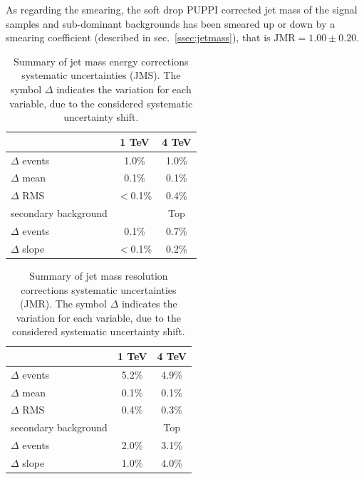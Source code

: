\noindent As regarding the smearing, the soft drop PUPPI corrected jet mass of the signal samples and sub-dominant backgrounds has been smeared up or down by a smearing coefficient (described in sec.~\ref{ssec:jetmass}), that is $ \text{JMR} = 1.00 \pm 0.20$.
\begin{table}[!htb]
  \centering
  \caption{Summary of jet mass energy corrections systematic uncertainties (JMS). The symbol $\Delta$ indicates the variation for each variable, due to the considered systematic uncertainty shift. \label{tab:jet_mass_energy_corr}}
  \begin{tabular}{l|cc}
	\mtVZ & 1 TeV & 4 TeV \\
        \hline
	\hline
	$\Delta$ events & 1.0\% & 1.0\% \\
	$\Delta$ mean & 0.1\%& 0.1\% \\
	$\Delta$ RMS & $<$0.1\% & 0.4\% \\
	\hline
	secondary background & \VV & Top \\
        \hline
	$\Delta$ events & 0.1\% & 0.7\% \\
	$\Delta$ slope & $<$0.1\% & 0.2\% \\
  \end{tabular}

\end{table}


\begin{table}[!htb]
  \centering
  \caption{Summary of jet mass resolution corrections systematic uncertainties (JMR). The symbol $\Delta$ indicates the variation for each variable, due to the considered systematic uncertainty shift. \label{tab:jet_mass_res_corr}}
  \begin{tabular}{l|cc}
	\mtVZ & 1 TeV & 4 TeV \\
        \hline
	\hline
	$\Delta$ events & 5.2\% & 4.9\% \\
	$\Delta$ mean & 0.1\%& 0.1\% \\
	$\Delta$ RMS & 0.4\% & 0.3\% \\
	\hline
	secondary background & \VV & Top \\
        \hline
	$\Delta$ events & 2.0\% & 3.1\% \\
	$\Delta$ slope & 1.0\% & 4.0\% \\
  \end{tabular}

\end{table}

